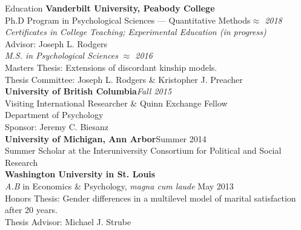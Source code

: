 
\begin{rSection}{\textrm{Education}}
{\bf Vanderbilt University, Peabody College}\\
Ph.D Program in Psychological Sciences --- Quantitative Methods\hfill  {\em $\approx$ 2018} \\
\hspace*{\pindent}\textit{Certificates in College Teaching; Experimental Education (in progress)}\\
\hspace*{\pindent}Advisor: Joseph L. Rodgers%
\smallskip\\
\textit{M.S. in Psychological Sciences} \hfill  {\em $\approx$ 2016} \\
\hspace*{\pindent}Masters Thesis: Extensions of discordant kinship models.\\
\hspace*{\pindent}Thesis Committee: Joseph L. Rodgers \& Kristopher J. Preacher%
\medskip\\
\textbf{University of British Columbia}\hfill \textit{Fall 2015}\\ 
Visiting International Researcher \& Quinn Exchange Fellow\\
\hspace*{\pindent}Department of Psychology\\
\hspace*{\pindent}Sponsor: Jeremy C. Biesanz\medskip\\
\textbf{University of Michigan, Ann Arbor}\hfill Summer 2014\\ 
Summer Scholar at the Interuniversity Consortium for Political and Social Research\medskip\\
{\bf Washington University in St. Louis}\\
{\em A.B} in Economics \& Psychology, \textit{magna cum laude} \hfill  {May 2013} \\
\hspace*{\pindent}Honors Thesis: Gender differences in a multilevel model of marital satisfaction after 20 years.\\
\hspace*{\pindent}Thesis Advisor: Michael J. Strube%
\end{rSection}